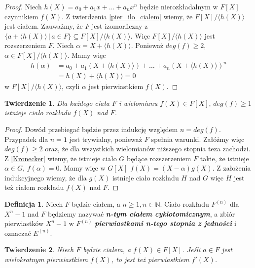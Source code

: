 \documentclass[polish,declaration,shortabstract]{iithesis}
\theoremstyle{definition}
\newtheorem{definition}{Definicja}
\theoremstyle{remark} \newtheorem{observation}{Obserwacja}
\theoremstyle{plain} \newtheorem{theorem}{Twierdzenie}
\theoremstyle{plain} \newtheorem{lemma}{Lemat}
\theoremstyle{remark} \newtheorem*{remark*}{Uwaga}
\theoremstyle{reminder} \newtheorem*{reminder*}{Przypomnienie}
\begin{document}
\begin{proof}
	Niech $h(X) = a_0 + a_1x + \dots + a_nx^n$ będzie nierozkładalnym w $F[X]$ czynnikiem $f(X)$. Z twierdzenia \ref{pier_ilo_cialem} 
	wiemy, że $F[X]/\langle h(X) \rangle$ jest ciałem. 
	Zauważmy, że $F$ jest izomorficzny z $\{a + \langle h(X) \rangle \, | \, a \in F\} \subseteq F[X]/\langle h(X) \rangle$. 
	Więc $F[X]/\langle h(X) \rangle$ jest rozszerzeniem $F$.\newline
	Niech $\alpha = X + \langle h(X)\rangle$. Ponieważ $deg(f) \geq 2$, $\alpha \in F[X]/\langle h(X) \rangle$. Mamy więc 
	\begin{align*}
		h(\alpha) & = a_0 + a_1(X + \langle h(X)\rangle) + \dots + a_n(X+\langle h(X)\rangle)^n \\
		          & = h(X) + \langle h(X) \rangle = 0                                           
	\end{align*}
	w $F[X]/\langle h(X) \rangle$, czyli $\alpha$ jest pierwiastkiem $f(X)$.
\end{proof}

	
\begin{theorem}
	Dla każdego ciała $F$ i wielomianu $f(X) \in F[X], \, deg(f) \geq 1$ istnieje ciało rozkładu $f(X)$ nad $F$.
\end{theorem}
	
\begin{proof}
	Dowód przebiegać będzie przez indukcję względem $n = deg(f)$. Przypadek dla $n = 1$ jest trywialny, ponieważ $F$ spełnia warunki. Załóżmy więc $deg(f) \geq 2$ oraz, że dla wszystkich wielomianów niższego stopnia teza zachodzi. Z \ref{Kronecker} wiemy, że istnieje ciało $G$ będące rozszerzeniem $F$ takie, że istnieje $\alpha \in G, \, f(\alpha) = 0$. Mamy więc w $G[X]$ $f(X) = (X - \alpha)g(X)$. Z założenia indukcyjnego wiemy, że dla $g(X)$ istnieje ciało rozkładu $H$ nad $G$ więc $H$ jest też ciałem rozkładu $f(X)$ nad $F$.
\end{proof}
	
\begin{definition}
	Niech $F$ będzie ciałem, a $n \geq 1, n \in \mathbb{N}$. Ciało rozkładu $F^{(n)}$ dla $X^n - 1$ nad $F$ będziemy nazywać \textit{\textbf{n-tym ciałem cyklotomicznym}}, a zbiór pierwiastków $X^n - 1$ w $F^{(n)}$ \textit{\textbf{pierwiastkami n-tego stopnia z jedności}} i oznaczać $E^{(n)}$.
\end{definition}
	
\begin{theorem} \label{mult_root}
	Niech $F$ będzie ciałem, a $f(X) \in F[X]$. Jeśli $a \in F$ jest wielokrotnym pierwiastkiem $f(X)$, to jest też pierwiastkiem $f'(X)$.
\end{theorem}
	
\end{document}
